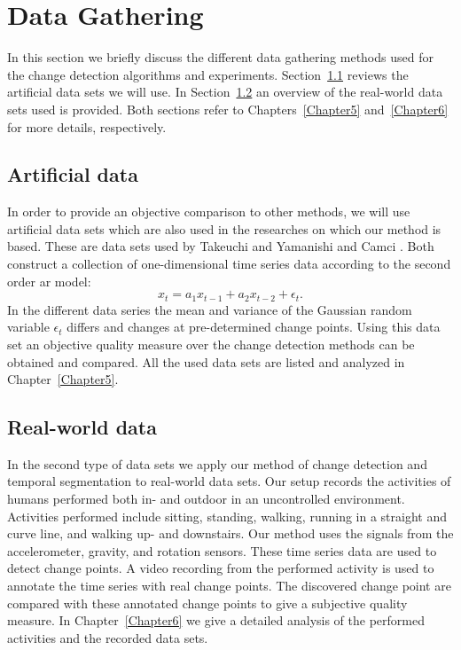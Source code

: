 \section{Data Gathering}\label{sec:method_data_gathering}
In this section we briefly discuss the different data gathering methods used for the change detection algorithms and experiments.
Section~\ref{subsec:data_gathering_artificial} reviews the artificial data sets we will use.
In Section~\ref{subsec:data_gathering_real_world} an overview of the real-world data sets used is provided.
Both sections refer to Chapters~\ref{Chapter5} and~\ref{Chapter6} for more details, respectively.

\subsection{Artificial data}\label{subsec:data_gathering_artificial}
In order to provide an objective comparison to other methods, we will use artificial data sets which are also used in the researches on which our method is based.
These are data sets used by Takeuchi and Yamanishi \cite{takeuchi2006unifying} and Camci \cite{camci2010change}.
Both construct a collection of one-dimensional time series data according to the second order \gls{ar} model:
\begin{equation}
  x_t = a_1 x_{t-1} + a_2 x_{t-2} + \epsilon_t.
\end{equation}
In the different data series the mean and variance of the Gaussian random variable $\epsilon_t$ differs and changes at pre-determined change points.
Using this data set an objective quality measure over the change detection methods can be obtained and compared.
All the used data sets are listed and analyzed in Chapter~\ref{Chapter5}.

\subsection{Real-world data}\label{subsec:data_gathering_real_world}
In the second type of data sets we apply our method of change detection and temporal segmentation to real-world data sets.
Our setup records the activities of humans performed both in- and outdoor in an uncontrolled environment.
Activities performed include sitting, standing, walking, running in a straight and curve line, and walking up- and downstairs.
Our method uses the signals from the accelerometer, gravity, and rotation sensors.
These time series data are used to detect change points.
A video recording from the performed activity is used to annotate the time series with real change points.
The discovered change point are compared with these annotated change points to give a subjective quality measure.
In Chapter~\ref{Chapter6} we give a detailed analysis of the performed activities and the recorded data sets.